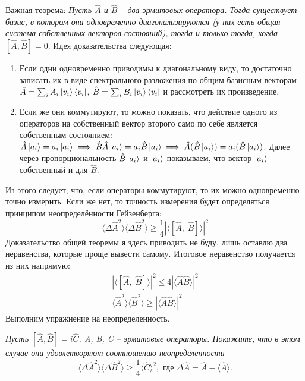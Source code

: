 Важная теорема: \textit{Пусть $\hat{A}$ и $\hat{B}$ -- два эрмитовых оператора. Тогда существует базис, в котором они одновременно диагонализируются (у них есть общая система собственных векторов состояний), тогда и только тогда, когда $[\hat{A}, \hat{B}] = 0$}. Идея доказательства следующая:
\begin{enumerate}
    \item Если одни одновременно приводимы к диагональному виду, то достаточно записать их в виде спектрального разложения по общим базисным векторам $\hat{A} = \sum_i A_i \ket{v_i}\bra{v_i}$, $\hat{B} = \sum_i B_i \ket{v_i}\bra{v_i}$ и рассмотреть их произведение.
    \item Если же они коммутируют, то можно показать, что действие одного из операторов на собственный вектор второго само по себе является собственным состоянием: $\hat{A} \ket{a_i} = a_i \ket{a_i} \implies \hat{B} \hat{A} \ket{a_i} = a_i \hat{B} \ket{a_i} \implies \hat{A} ( \hat{B} \ket{a_i} ) = a_i ( \hat{B} \ket{a_i} )$. Далее через пропорциональность $\hat{B} \ket{a_i}$ и $\ket{a_i}$ показываем, что вектор $\ket{a_i}$ собственный и для $\hat{B}$.
\end{enumerate}

Из этого следует, что, если операторы коммутируют, то их можно одновременно точно измерить. Если же нет, то точность измерения будет определяться принципом неопределённости Гейзенберга:
\[
\langle \Delta \hat{A}^2 \rangle \langle \Delta \hat{B}^2 \rangle \geq \frac{1}{4} |\langle [\hat{A}, \; \hat{B}] \rangle|^2
\]
Доказательство общей теоремы я здесь приводить не буду, лишь оставлю два неравенства, которые проще вывести самому. Итоговое неравенство получается из них напрямую:
\begin{gather*}
    |\langle [\hat{A}, \; \hat{B}] \rangle|^2 \leq 4|\langle \hat{A}\hat{B}\rangle|^2 \\
    \langle \hat{A}^2 \rangle \langle \hat{B}^2 \rangle \geq |\langle \hat{A}\hat{B}\rangle|^2
\end{gather*}
Выполним упражнение на неопределенность.
\begin{center}
\textit{Пусть $[\hat A, \hat B] = i\hat C$. A, B, C -- эрмитовые операторы. Покажите, что в этом случае они удовлетворяют соотношению неопределенности}
\[
\langle \Delta \hat A^2\rangle \langle \Delta \hat B^2\rangle \geq \frac{1}{4} \langle \hat C\rangle^2, \textit{ где } \Delta \hat A = \hat A - \langle \hat A \rangle.
\]
\end{center}


